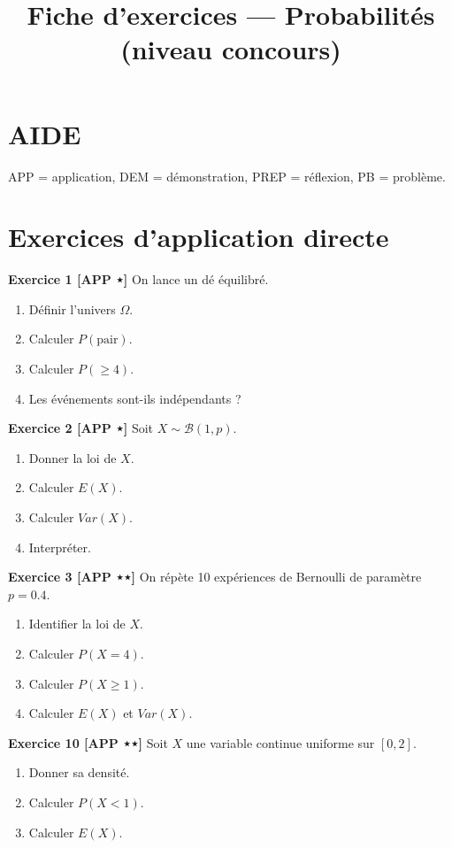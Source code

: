 \documentclass[11pt,a4paper]{article}
\title{\textbf{Fiche d’exercices — Probabilités (niveau concours)}}
\date{}
\begin{document}
\maketitle

\section*{AIDE}
APP = application, DEM = démonstration, PREP = réflexion, PB = problème.

\section{Exercices d’application directe}

\textbf{Exercice 1 [APP ⋆]}  
On lance un dé équilibré.  
\begin{enumerate}
\item Définir l’univers $\Omega$.
\item Calculer $P(\text{pair})$.
\item Calculer $P(\geq 4)$.
\item Les événements sont-ils indépendants ?
\end{enumerate}

\textbf{Exercice 2 [APP ⋆]}  
Soit $X \sim \mathcal{B}(1,p)$.  
\begin{enumerate}
\item Donner la loi de $X$.
\item Calculer $E(X)$.
\item Calculer $Var(X)$.
\item Interpréter.
\end{enumerate}

\textbf{Exercice 3 [APP ⋆⋆]}  
On répète 10 expériences de Bernoulli de paramètre $p=0.4$.  
\begin{enumerate}
\item Identifier la loi de $X$.
\item Calculer $P(X=4)$.
\item Calculer $P(X\geq 1)$.
\item Calculer $E(X)$ et $Var(X)$.
\end{enumerate}

\textbf{Exercice 10 [APP ⋆⋆]}  
Soit $X$ une variable continue uniforme sur $[0,2]$.  
\begin{enumerate}
\item Donner sa densité.
\item Calculer $P(X<1)$.
\item Calculer $E(X)$.
\end{enumerate}
\end{document}
